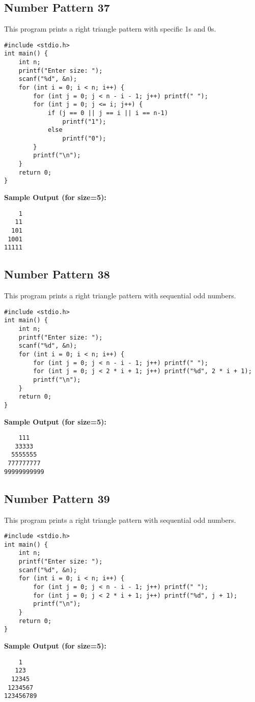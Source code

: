 \documentclass[a4paper,12pt]{article}
\begin{document}
\subsection{Number Pattern 37}
This program prints a right triangle pattern with specific 1s and 0s.
\begin{lstlisting}[caption={Number Pattern 37}]
#include <stdio.h>
int main() {
    int n;
    printf("Enter size: ");
    scanf("%d", &n);
    for (int i = 0; i < n; i++) {
        for (int j = 0; j < n - i - 1; j++) printf(" ");
        for (int j = 0; j <= i; j++) {
            if (j == 0 || j == i || i == n-1)
                printf("1");
            else
                printf("0");
        }
        printf("\n");
    }
    return 0;
}
\end{lstlisting}
\textbf{Sample Output (for size=5):}
\begin{verbatim}
    1
   11
  101
 1001
11111
\end{verbatim}
\clearpage

\subsection{Number Pattern 38}
This program prints a right triangle pattern with sequential odd numbers.
\begin{lstlisting}[caption={Number Pattern 38}]
#include <stdio.h>
int main() {
    int n;
    printf("Enter size: ");
    scanf("%d", &n);
    for (int i = 0; i < n; i++) {
        for (int j = 0; j < n - i - 1; j++) printf(" ");
        for (int j = 0; j < 2 * i + 1; j++) printf("%d", 2 * i + 1);
        printf("\n");
    }
    return 0;
}
\end{lstlisting}
\textbf{Sample Output (for size=5):}
\begin{verbatim}
    111
   33333
  5555555
 777777777
99999999999
\end{verbatim}
\clearpage

\subsection{Number Pattern 39}
This program prints a right triangle pattern with sequential odd numbers.
\begin{lstlisting}[caption={Number Pattern 39}]
#include <stdio.h>
int main() {
    int n;
    printf("Enter size: ");
    scanf("%d", &n);
    for (int i = 0; i < n; i++) {
        for (int j = 0; j < n - i - 1; j++) printf(" ");
        for (int j = 0; j < 2 * i + 1; j++) printf("%d", j + 1);
        printf("\n");
    }
    return 0;
}
\end{lstlisting}
\textbf{Sample Output (for size=5):}
\begin{verbatim}
    1
   123
  12345
 1234567
123456789
\end{verbatim}
\clearpage
\end{document}
